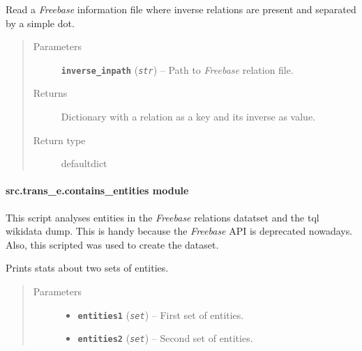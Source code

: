 \documentclass[letterpaper,10pt,english]{sphinxmanual}
\begin{document}

\begin{fulllineitems}
\label{src.trans_e:src.trans_e.add_inverse_relations.read_file_with_inverse_relations}
Read a \emph{Freebase} information file where inverse relations are present and separated by a simple dot.
\begin{quote}\begin{description}
\item[{Parameters}] \leavevmode
\textbf{\texttt{inverse\_inpath}} (\emph{\texttt{str}}) -- Path to \emph{Freebase} relation file.

\item[{Returns}] \leavevmode
Dictionary with a relation as a key and its inverse as value.

\item[{Return type}] \leavevmode
defaultdict

\end{description}\end{quote}

\end{fulllineitems}



\paragraph{src.trans\_e.contains\_entities module}
\label{src.trans_e:src-trans-e-contains-entities-module}\label{src.trans_e:module-src.trans_e.contains_entities}
This script analyses entities in the \emph{Freebase}  relations datatset and the tql wikidata dump.
This is handy because the \emph{Freebase} API is deprecated nowadays. Also, this scripted was used to create the 
dataset.

\begin{fulllineitems}
\label{src.trans_e:src.trans_e.contains_entities.contains_entities}
Prints stats about two sets of entities.
\begin{quote}\begin{description}
\item[{Parameters}] \leavevmode\begin{itemize}
\item {} 
\textbf{\texttt{entities1}} (\emph{\texttt{set}}) -- First set of entities.

\item {} 
\textbf{\texttt{entities2}} (\emph{\texttt{set}}) -- Second set of entities.

\end{itemize}

\end{description}\end{quote}

\end{fulllineitems}
\end{document}
